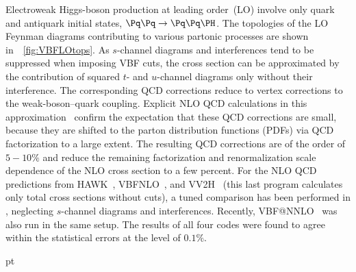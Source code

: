 Electroweak Higgs-boson production at leading order~(LO) involve only quark
and antiquark initial states, $\Pq \Pq\to \Pq \Pq\PH$.  The topologies of the
LO Feynman diagrams contributing to various partonic processes are shown
in~\Figure~\ref{fig:VBFLOtops}.  As $s$-channel diagrams and interferences
tend to be suppressed when imposing VBF cuts, the cross section can be
approximated by the contribution of squared $t$- and $u$-channel diagrams only
without their interference.  The
corresponding QCD corrections reduce to vertex corrections to the
weak-boson--quark coupling.  Explicit NLO QCD calculations in this
approximation~\cite{Spira:1997dg,Han:1992hr,Figy:2003nv,Figy:2004pt,Berger:2004pca}
confirm the expectation that these QCD corrections are small, because they
are shifted to the parton distribution functions (PDFs) via QCD factorization
to a large extent. The resulting QCD corrections are of the order of
$5{-}10\%$ and reduce the remaining factorization and renormalization scale
dependence of the NLO cross section to a few percent.
For the NLO QCD predictions from {\sc
  HAWK}~\cite{Ciccolini:2007jr,Ciccolini:2007ec,HAWK}, {\sc
  VBFNLO}~\cite{Figy:2003nv,Arnold:2008rz}, and {\sc VV2H}~\cite{VV2H} (this last
program calculates only total cross sections without cuts), a tuned
comparison has been performed in , neglecting $s$-channel
diagrams and interferences. Recently, {\sc VBF@NNLO}~\cite{Bolzoni:2010xr}
was also run in the same setup.  The results of all four codes were found to
agree within the statistical errors at the level of $0.1\%$.


\newcommand\scalefac{0.9}
\newlength{\largfig}
\largfig=\scalefac pt

